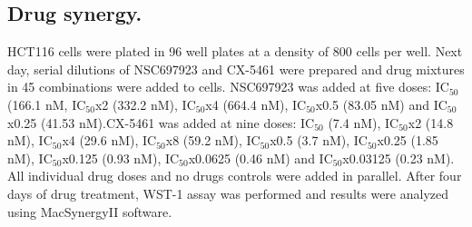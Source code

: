 \subsection{Drug synergy.}
HCT116 cells were plated in 96 well plates at a density of 800 cells per well. Next day, serial dilutions of NSC697923 and CX-5461 were prepared and drug mixtures in 45 combinations were added to cells. NSC697923 was added at five doses: IC$_{50}$ (166.1 nM, IC$_{50}$x2 (332.2 nM), IC$_{50}$x4 (664.4 nM), IC$_{50}$x0.5 (83.05 nM) and IC$_{50}$x0.25 (41.53 nM).CX-5461 was added at nine doses: IC$_{50}$ (7.4 nM), IC$_{50}$x2 (14.8 nM), IC$_{50}$x4 (29.6 nM), IC$_{50}$x8 (59.2 nM), IC$_{50}$x0.5 (3.7 nM), IC$_{50}$x0.25 (1.85 nM), IC$_{50}$x0.125 (0.93 nM), IC$_{50}$x0.0625 (0.46 nM) and IC$_{50}$x0.03125 (0.23 nM). All individual drug doses and no drugs controls were added in parallel. After four days of drug treatment, WST-1 assay was performed and results were analyzed using MacSynergyII software.   

